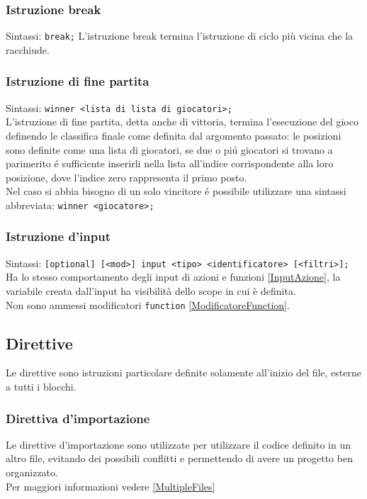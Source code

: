 \subsubsection{Istruzione break}
Sintassi: \lstinline|break;|
L'istruzione break termina l'istruzione di ciclo più vicina che la racchiude.

\subsubsection{Istruzione di fine partita}
Sintassi: \lstinline|winner <lista di lista di giocatori>;| \\
L'istruzione di fine partita, detta anche di vittoria, termina l'esecuzione del gioco definendo 
le classifica finale come definita dal argomento passato: le posizioni sono definite come una lista di giocatori,
se due o piú giocatori si trovano a parimerito é sufficiente inserirli nella lista all'indice corrispondente 
alla loro posizione, dove l'indice zero rappresenta il primo posto. \\
Nel caso si abbia bisogno di un solo vincitore é possibile utilizzare una sintassi abbreviata: 
\lstinline|winner <giocatore>;| 

\subsubsection{Istruzione d'input}
Sintassi: \lstinline|[optional] [<mod>] input <tipo> <identificatore> [<filtri>];|
Ha lo stesso comportamento degli input di azioni e funzioni \ref{InputAzione}, la variabile
creata dall'input ha visibilità dello scope in cui è definita. \\
Non sono ammessi modificatori \lstinline|function| \ref{ModificatoreFunction}.


\subsection{Direttive}
Le direttive sono istruzioni particolare definite solamente all'inizio del file, esterne a 
tutti i blocchi.

\subsubsection{Direttiva d'importazione}
Le direttive d'importazione sono utilizzate per utilizzare il codice definito in un altro
file, evitando dei possibili conflitti e permettendo di avere un progetto ben organizzato. \\
Per maggiori informazioni vedere \ref{MultipleFiles}

